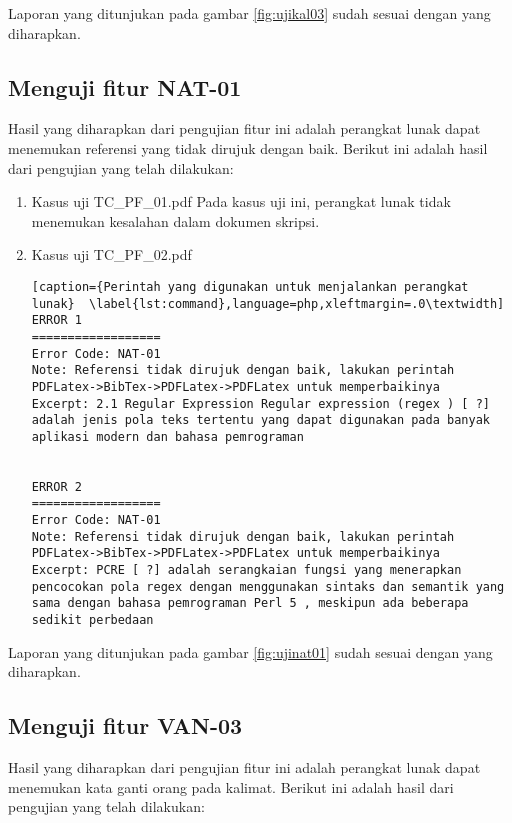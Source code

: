 Laporan yang ditunjukan pada gambar \ref{fig:ujikal03} sudah sesuai dengan yang diharapkan.

\subsection{Menguji fitur NAT-01}
Hasil yang diharapkan dari pengujian fitur ini adalah perangkat lunak dapat menemukan referensi yang tidak dirujuk dengan baik. Berikut ini adalah hasil dari pengujian yang telah dilakukan:

\begin{enumerate}
	\item Kasus uji TC\_PF\_01.pdf
	Pada kasus uji ini, perangkat lunak tidak menemukan kesalahan dalam dokumen skripsi.
	
	\item Kasus uji TC\_PF\_02.pdf
	
\begin{lstlisting}[caption={Perintah yang digunakan untuk menjalankan perangkat lunak}	\label{lst:command},language=php,xleftmargin=.0\textwidth]
ERROR 1
==================
Error Code: NAT-01
Note: Referensi tidak dirujuk dengan baik, lakukan perintah PDFLatex->BibTex->PDFLatex->PDFLatex untuk memperbaikinya
Excerpt: 2.1 Regular Expression Regular expression (regex ) [ ?] adalah jenis pola teks tertentu yang dapat digunakan pada banyak aplikasi modern dan bahasa pemrograman


ERROR 2
==================
Error Code: NAT-01
Note: Referensi tidak dirujuk dengan baik, lakukan perintah PDFLatex->BibTex->PDFLatex->PDFLatex untuk memperbaikinya
Excerpt: PCRE [ ?] adalah serangkaian fungsi yang menerapkan pencocokan pola regex dengan menggunakan sintaks dan semantik yang sama dengan bahasa pemrograman Perl 5 , meskipun ada beberapa sedikit perbedaan
\end{lstlisting}
\end{enumerate}

Laporan yang ditunjukan pada gambar \ref{fig:ujinat01} sudah sesuai dengan yang diharapkan.

\subsection{Menguji fitur VAN-03}
Hasil yang diharapkan dari pengujian fitur ini adalah perangkat lunak dapat menemukan kata ganti orang pada kalimat. Berikut ini adalah hasil dari pengujian yang telah dilakukan:

